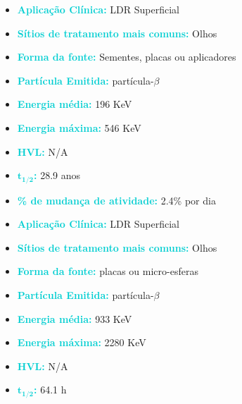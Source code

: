 \documentclass[11pt,a4paper]{article}
\begin{document}
		\begin{tcolorbox}[width=\textwidth, colback={white}, colbacktitle={DarkTurquoise!50!white}, title={$\bigstar$ \LobsterTwo{Estrôncio 90} $\bigstar$}, coltitle={CarnationPink}, colframe={DarkTurquoise}, fonttitle=\rmfamily\bfseries\Large, breakable]
			\begin{itemize}
				\item \textcolor{DarkTurquoise}{\textbf{Aplicação Clínica:}} LDR Superficial
				\item \textcolor{DarkTurquoise}{\textbf{Sítios de tratamento mais comuns:}} Olhos
				\item \textcolor{DarkTurquoise}{\textbf{Forma da fonte:}} Sementes, placas ou aplicadores
				\item \textcolor{DarkTurquoise}{\textbf{Partícula Emitida:}} partícula-$\beta$
				\item \textcolor{DarkTurquoise}{\textbf{Energia média:}} 196 KeV 
				\item \textcolor{DarkTurquoise}{\textbf{Energia máxima:}} 546 KeV
				\item \textcolor{DarkTurquoise}{\textbf{HVL:}} N/A
				\item \textcolor{DarkTurquoise}{\textbf{$\mathbf{t_{1/2}}$:}} 28.9 anos
				\item \textcolor{DarkTurquoise}{\textbf{\% de mudança de atividade:}} 2.4\% por dia
			\end{itemize}
		\end{tcolorbox}

		\begin{tcolorbox}[width=\textwidth, colback={white}, colbacktitle={DarkTurquoise!50!white}, title={$\bigstar$ \LobsterTwo{Ítrio 90} $\bigstar$}, coltitle={CarnationPink}, colframe={DarkTurquoise}, fonttitle=\rmfamily\bfseries\Large, breakable]
			\begin{itemize}
				\item \textcolor{DarkTurquoise}{\textbf{Aplicação Clínica:}} LDR Superficial
				\item \textcolor{DarkTurquoise}{\textbf{Sítios de tratamento mais comuns:}} Olhos
				\item \textcolor{DarkTurquoise}{\textbf{Forma da fonte:}} placas ou micro-esferas
				\item \textcolor{DarkTurquoise}{\textbf{Partícula Emitida:}} partícula-$\beta$
				\item \textcolor{DarkTurquoise}{\textbf{Energia média:}} 933 KeV 
				\item \textcolor{DarkTurquoise}{\textbf{Energia máxima:}} 2280 KeV
				\item \textcolor{DarkTurquoise}{\textbf{HVL:}} N/A
				\item \textcolor{DarkTurquoise}{\textbf{$\mathbf{t_{1/2}}$:}} 64.1 h 
			\end{itemize}
		\end{tcolorbox}
\end{document}
